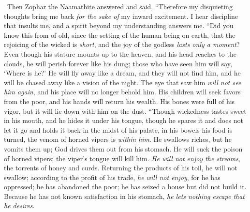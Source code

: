 \begin{biblechapter} %
  Then Zophar the Naamathite answered and said,
\verse “Therefore my disquieting thoughts bring me back 
\textit{for the sake of} my inward excitement.
\verse I hear discipline that insults me, 
and a spirit beyond my understanding answers me.
\verse “Did you know this from of old, 
since the setting of the human being on earth,
\verse that the rejoicing of the wicked is \textit{short}, 
and the joy of the godless \textit{lasts only a moment}?
\verse Even though his stature mounts up to the heaven, 
and his head reaches to the clouds,
\verse he will perish forever like his dung; 
those who have seen him will say, ‘Where is he?’
\verse He will fly away like a dream, and they will not find him, 
and he will be chased away like a vision of the night.
\verse The eye that saw him \textit{will not see him again}, 
and his place will no longer behold him.
\verse His children will seek favors from the poor, 
and his hands will return his wealth.
\verse His bones were full of his vigor, 
but it will lie down with him on the dust.
\verse “Though wickedness tastes sweet in his mouth, 
and he hides it under his tongue,
\verse though he spares it and does not let it go 
and holds it back in the midst of his palate,
\verse in his bowels his food is turned, 
the venom of horned vipers is \textit{within him}.
\verse He swallows riches, but he vomits them up; 
God drives them out from his stomach.
\verse He will suck the poison of horned vipers; 
the viper’s tongue will kill him.
\verse \textit{He will not enjoy the streams}, 
the torrents of honey and curds.
\verse Returning the products of his toil, he will not swallow; 
according to the profit of his trade, \textit{he will not enjoy},
\verse for he has oppressed; he has abandoned the poor; 
he has seized a house but did not build it.
\verse Because he has not known satisfaction in his stomach, 
\textit{he lets nothing escape that he desires}.

\end{biblechapter}
